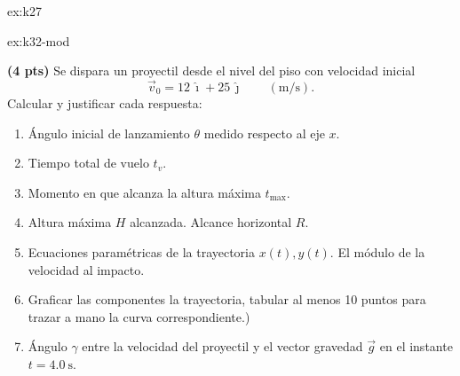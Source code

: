 \begin{multicols}{2}
\begin{excercise}[][][a) $\vec{e}_t=\frac{1}{\sqrt{t^2+8}}(t\vec{\imath}+2\vec{\jmath}-2\vec{k})$, b) $\rho=\sqrt{\frac{(t^2+8)^3}{8}}$, c) $\vec{e}_n=\frac{1}{\sqrt{8(t^2+8)}}(8\vec{\imath}-2t\vec{\jmath}+2t\vec{k})$, ]{ex:k27}
{         }
    \end{excercise}

    \begin{excercise}[][][a) $\theta=64.36^\circ$, 
b) $t_{\text{vuelo}}=5.10\ \mathrm{s}$, 
c) $t_{\max}=2.55\ \mathrm{s}$, 
d) $H=31.89\ \mathrm{m}$, 
e) $R=61.22\ \mathrm{m}$, 
f) $v=27.73\ \mathrm{m/s}$, 
g) $\gamma(t=4\,\mathrm{s})\approx40.20^\circ$
]{ex:k32-mod}{
    \textbf{(4 pts)}
     Se dispara un proyectil desde el nivel del piso con velocidad inicial
    \[
        \vec v_0 = 12\,\hat\imath + 25\,\hat\jmath \qquad (\mathrm{m/s}).
    \]
    Calcular y justificar cada respuesta:
    \begin{enumerate}
        \item Ángulo inicial de lanzamiento \(\theta\) medido respecto al eje \(x\).
        \item Tiempo total de vuelo \(t_v\).
        \item Momento en que alcanza la altura máxima \(t_{\max}\).
        \item Altura máxima \(H\) alcanzada.  Alcance horizontal \(R\).
        \item Ecuaciones paramétricas de la trayectoria \(x(t),y(t)\). El módulo de la velocidad al impacto.
        \item Graficar las componentes la trayectoria, tabular al menos 10 puntos para trazar a mano la curva correspondiente.)
        \item Ángulo \(\gamma\) entre la velocidad del proyectil y el vector gravedad \(\vec g\) en el instante \(t=4.0\ \mathrm{s}\). 
    \end{enumerate}
}
\end{excercise}


\end{multicols}
